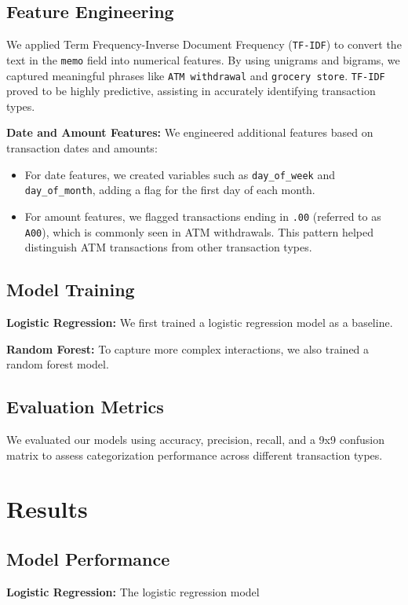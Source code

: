 \documentclass[12pt,letterpaper]{article}
\begin{document}
\subsection{Feature Engineering}
We applied Term Frequency-Inverse Document Frequency (\texttt{TF-IDF}) to convert the text in the \texttt{memo} field into numerical features. By using unigrams and bigrams, we captured meaningful phrases like \texttt{ATM withdrawal} and \texttt{grocery store}. \texttt{TF-IDF} proved to be highly predictive, assisting in accurately identifying transaction types.

\textbf{Date and Amount Features:} We engineered additional features based on transaction dates and amounts:
\begin{itemize}
    \item For date features, we created variables such as \texttt{day\_of\_week} and \texttt{day\_of\_month}, adding a flag for the first day of each month.
    \item For amount features, we flagged transactions ending in \texttt{.00} (referred to as \texttt{A00}), which is commonly seen in ATM withdrawals. This pattern helped distinguish ATM transactions from other transaction types.
\end{itemize}

\subsection{Model Training}
\textbf{Logistic Regression:} We first trained a logistic regression model as a baseline.

\textbf{Random Forest:} To capture more complex interactions, we also trained a random forest model.

\subsection{Evaluation Metrics}
We evaluated our models using accuracy, precision, recall, and a 9x9 confusion matrix to assess categorization performance across different transaction types. 


\section{Results}
\subsection{Model Performance}
\textbf{Logistic Regression:} The logistic regression model
\end{document}
